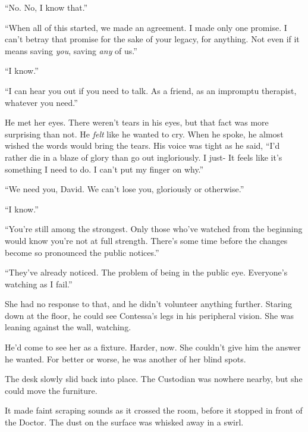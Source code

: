 ``No.  No, I know that.''



``When all of this started, we made an agreement.  I made only one promise.  I can't betray that promise for the sake of your legacy, for anything.  Not even if it means saving \emph{you}, saving \emph{any} of us.''



``I know.''



``I can hear you out if you need to talk.  As a friend, as an impromptu therapist, whatever you need.''



He met her eyes.  There weren't tears in his eyes, but that fact was more surprising than not.  He \emph{felt} like he wanted to cry.  When he spoke, he almost wished the words would bring the tears.  His voice was tight as he said, ``I'd rather die in a blaze of glory than go out ingloriously.  I just-  It feels like it's something I need to do.  I can't put my finger on why.''



``We need you, David.  We can't lose you, gloriously or otherwise.''



``I know.''



``You're still among the strongest.  Only those who've watched from the beginning would know you're not at full strength.  There's some time before the changes become so pronounced the public notices.''



``They've already noticed.  The problem of being in the public eye.  Everyone's watching as I fail.''



She had no response to that, and he didn't volunteer anything further.  Staring down at the floor, he could see Contessa's legs in his peripheral vision.  She was leaning against the wall, watching.



He'd come to see her as a fixture.  Harder, now.  She couldn't give him the answer he wanted.  For better or worse, he was another of her blind spots.



The desk slowly slid back into place.  The Custodian was nowhere nearby, but she could move the furniture.



It made faint scraping sounds as it crossed the room, before it stopped in front of the Doctor.  The dust on the surface was whisked away in a swirl.



